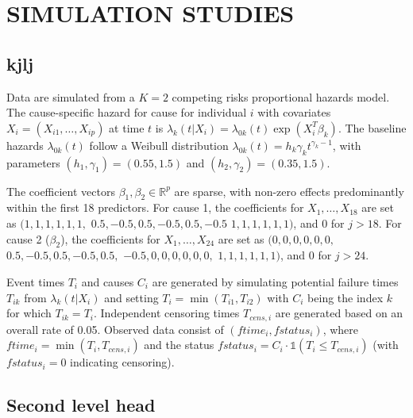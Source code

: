 \documentclass[AMA,Times1COL]{WileyNJDv5} %
\begin{document}
\section{SIMULATION STUDIES}\label{sec3}

\subsection{kjlj}

Data are simulated from a $K=2$ competing risks proportional hazards model. The cause-specific hazard for cause for individual $i$ with covariates $X_i = (X_{i1}, \dots, X_{ip})$ at time $t$ is $\lambda_k(t | X_i) = \lambda_{0k}(t) \exp(X_i^T \beta_k)$. The baseline hazards $\lambda_{0k}(t)$ follow a Weibull distribution $\lambda_{0k}(t) = h_k \gamma_k t^{\gamma_k - 1}$, with parameters $(h_1, \gamma_1)=(0.55, 1.5)$ and $(h_2, \gamma_2)=(0.35, 1.5)$.

The coefficient vectors $\beta_1, \beta_2 \in \mathbb{R}^p$ are sparse, with non-zero effects predominantly within the first 18 predictors. For cause 1, the coefficients for $X_1, \dots, X_{18}$ are set as $(1, 1, 1, 1, 1, 1,$ $0.5, -0.5, 0.5, -0.5, 0.5, -0.5$ $1, 1, 1, 1, 1, 1)$, and 0 for $j > 18$. For cause 2 ($\beta_2$), the coefficients for $X_1, \dots, X_{24}$ are set as $(0, 0, 0, 0, 0, 0,$ $0.5, -0.5, 0.5, -0.5, 0.5,$ $-0.5, 0, 0, 0, 0, 0, 0,$ $1, 1, 1, 1, 1, 1)$, and 0 for $j > 24$.

Event times $T_i$ and causes $C_i$ are generated by simulating potential failure times $T_{ik}$ from $\lambda_k(t|X_i)$ and setting $T_i = \min(T_{i1}, T_{i2})$ with $C_i$ being the index $k$ for which $T_{ik} = T_i$. Independent censoring times $T_{cens, i}$ are generated based on an overall rate of 0.05. Observed data consist of $(ftime_i, fstatus_i)$, where $ftime_i = \min(T_i, T_{cens, i})$ and the status $fstatus_i = C_i \cdot \mathds{1}(T_i \le T_{cens, i})$ (with $fstatus_i=0$ indicating censoring).


\subsection{Second level head}
\end{document}
